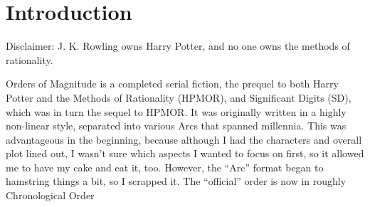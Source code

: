 \chapter{Introduction}
Disclaimer: J. K. Rowling owns Harry Potter, and no one owns the methods of
rationality.
\vspace*{0.5cm}\par
Orders of Magnitude is a completed serial fiction, the prequel to both Harry Potter
and the Methods of Rationality (HPMOR), and Significant Digits (SD), which was in
turn the sequel to HPMOR. It was originally written in a highly non-linear style,
separated into various Arcs that spanned millennia. This was advantageous in the
beginning, because although I had the characters and overall plot lined out, I wasn’t
sure which aspects I wanted to focus on first, so it allowed me to have my cake and
eat it, too. However, the “Arc” format began to hamstring things a bit, so I scrapped
it. The “official” order is now in roughly Chronological Order